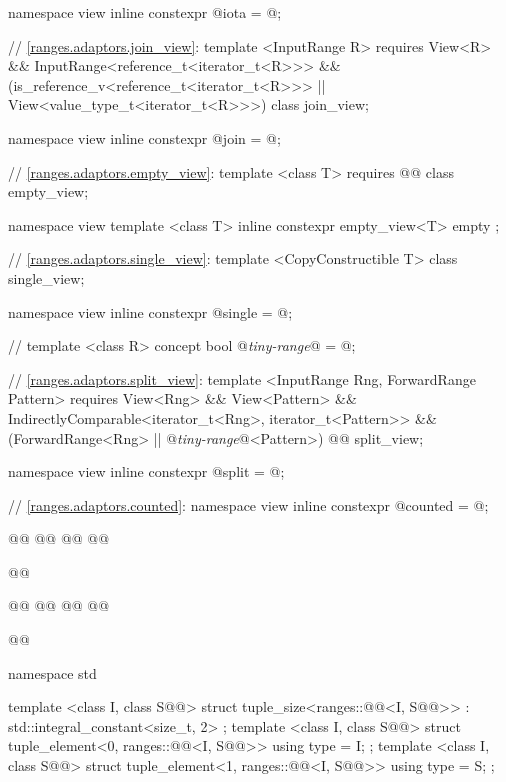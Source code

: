 \begin{codeblock}
{{{{  namespace view { inline constexpr @\unspec@ iota = @\unspec@; }

  // \ref{ranges.adaptors.join_view}:
  template <InputRange R>
    requires View<R> && InputRange<reference_t<iterator_t<R>>> &&
      (is_reference_v<reference_t<iterator_t<R>>> ||
        View<value_type_t<iterator_t<R>>>)
  class join_view;

  namespace view { inline constexpr @\unspec@ join = @\unspec@; }

  // \ref{ranges.adaptors.empty_view}:
  template <class T>
    requires @@
  class empty_view;

  namespace view {
    template <class T>
    inline constexpr empty_view<T> empty {};
  }

  // \ref{ranges.adaptors.single_view}:
  template <CopyConstructible T>
  class single_view;

  namespace view { inline constexpr @\unspec@ single = @\unspec@; }

  // \expos
  template <class R>
  concept bool @\textit{tiny-range}@ = @\seebelow@;

  // \ref{ranges.adaptors.split_view}:
  template <InputRange Rng, ForwardRange Pattern>
    requires View<Rng> && View<Pattern> &&
        IndirectlyComparable<iterator_t<Rng>, iterator_t<Pattern>> &&
        (ForwardRange<Rng> || @\textit{tiny-range}@<Pattern>)
  @@ split_view;

  namespace view { inline constexpr @\unspec@ split = @\unspec@; }

  // \ref{ranges.adaptors.counted}:
  namespace view { inline constexpr @\unspec@ counted = @\unspec@; }

  @\added{// \ref{ranges.adaptors.bounded_view}:}@
  @@
    @@
  @@

  @@

  @\added{// \ref{ranges.adaptors.reverse_view}:}@
  @@
    @@
  @@

  @@
}}}}

namespace std {
  template <class I, class S@@>
    struct tuple_size<ranges::@@<I, S@@>>
      : std::integral_constant<size_t, 2> {};
  template <class I, class S@@>
    struct tuple_element<0, ranges::@@<I, S@@>> {
      using type = I;
    };
  template <class I, class S@@>
    struct tuple_element<1, ranges::@@<I, S@@>> {
      using type = S;
    };

}
\end{codeblock}
